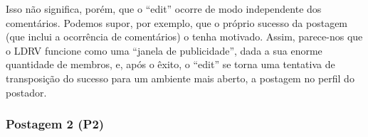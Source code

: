 \documentclass{textolivre-html}
\begin{document}
Isso não significa, porém, que o “edit” ocorre de modo independente dos comentários. Podemos supor, por exemplo, que o próprio sucesso da postagem (que inclui a ocorrência de comentários) o tenha motivado. Assim, parece-nos que o LDRV funcione como uma “janela de publicidade”, dada a sua enorme quantidade de membros, e, após o êxito, o “edit” se torna uma tentativa de transposição do sucesso para um ambiente mais aberto, a postagem no perfil do postador.


\subsubsection{Postagem 2 (P2)}\label{sec-postagem2}


\begin{figure}[htbp]
 \begin{minipage}{.45\textwidth}
 \centering

\end{minipage}
\end{figure}
\end{document}
